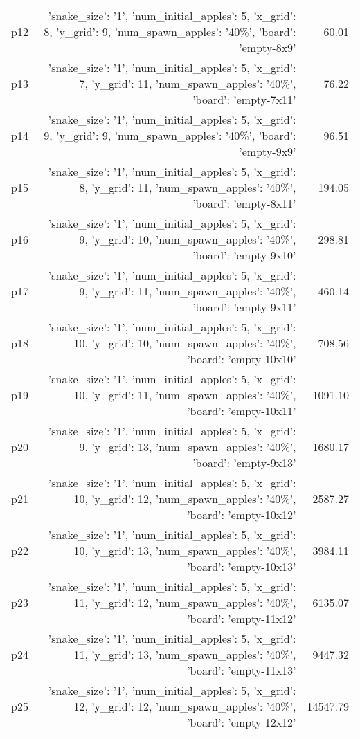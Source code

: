 \documentclass{article}
\begin{document}
\begin{center}
\begin{tabular}{@{}l|r|r@{}}
  p12&{'snake\_size': '1', 'num\_initial\_apples': 5, 'x\_grid': 8, 'y\_grid': 9, 'num\_spawn\_apples': '40\%', 'board': 'empty-8x9'}&60.01\\
  p13&{'snake\_size': '1', 'num\_initial\_apples': 5, 'x\_grid': 7, 'y\_grid': 11, 'num\_spawn\_apples': '40\%', 'board': 'empty-7x11'}&76.22\\
  p14&{'snake\_size': '1', 'num\_initial\_apples': 5, 'x\_grid': 9, 'y\_grid': 9, 'num\_spawn\_apples': '40\%', 'board': 'empty-9x9'}&96.51\\
  p15&{'snake\_size': '1', 'num\_initial\_apples': 5, 'x\_grid': 8, 'y\_grid': 11, 'num\_spawn\_apples': '40\%', 'board': 'empty-8x11'}&194.05\\
  p16&{'snake\_size': '1', 'num\_initial\_apples': 5, 'x\_grid': 9, 'y\_grid': 10, 'num\_spawn\_apples': '40\%', 'board': 'empty-9x10'}&298.81\\
  p17&{'snake\_size': '1', 'num\_initial\_apples': 5, 'x\_grid': 9, 'y\_grid': 11, 'num\_spawn\_apples': '40\%', 'board': 'empty-9x11'}&460.14\\
  p18&{'snake\_size': '1', 'num\_initial\_apples': 5, 'x\_grid': 10, 'y\_grid': 10, 'num\_spawn\_apples': '40\%', 'board': 'empty-10x10'}&708.56\\
  p19&{'snake\_size': '1', 'num\_initial\_apples': 5, 'x\_grid': 10, 'y\_grid': 11, 'num\_spawn\_apples': '40\%', 'board': 'empty-10x11'}&1091.10\\
  p20&{'snake\_size': '1', 'num\_initial\_apples': 5, 'x\_grid': 9, 'y\_grid': 13, 'num\_spawn\_apples': '40\%', 'board': 'empty-9x13'}&1680.17\\
  p21&{'snake\_size': '1', 'num\_initial\_apples': 5, 'x\_grid': 10, 'y\_grid': 12, 'num\_spawn\_apples': '40\%', 'board': 'empty-10x12'}&2587.27\\
  p22&{'snake\_size': '1', 'num\_initial\_apples': 5, 'x\_grid': 10, 'y\_grid': 13, 'num\_spawn\_apples': '40\%', 'board': 'empty-10x13'}&3984.11\\
  p23&{'snake\_size': '1', 'num\_initial\_apples': 5, 'x\_grid': 11, 'y\_grid': 12, 'num\_spawn\_apples': '40\%', 'board': 'empty-11x12'}&6135.07\\
  p24&{'snake\_size': '1', 'num\_initial\_apples': 5, 'x\_grid': 11, 'y\_grid': 13, 'num\_spawn\_apples': '40\%', 'board': 'empty-11x13'}&9447.32\\
  p25&{'snake\_size': '1', 'num\_initial\_apples': 5, 'x\_grid': 12, 'y\_grid': 12, 'num\_spawn\_apples': '40\%', 'board': 'empty-12x12'}&14547.79\\

\end{tabular}
\end{center}
\end{document}

